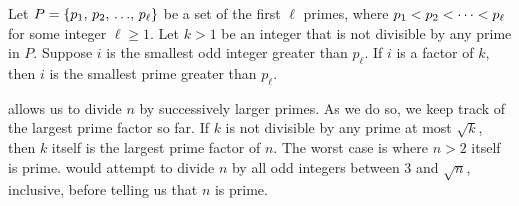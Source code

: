 \begin{theorem}
\label{thm:prime:next_smallest_prime}
Let $P = \left\{ {{p}_1},\, {{p}_2},\, {\dots},\, {{p}_{\ell}} \right\}$ be a set of the first $\ell$
primes, where ${p}_1 < {p}_2 < \cdots < {p}_{\ell}$ for some integer $\ell \geq 1$.  Let
$k > 1$ be an integer that is not divisible by any prime in $P$.
Suppose $i$ is the smallest odd integer greater than $p_{\ell}$.  If
$i$ is a factor of $k$, then $i$ is the smallest prime greater than
$p_{\ell}$.
\end{theorem}

 allows us to divide $n$ by
successively larger primes.  As we do so, we keep track of the largest
prime factor so far.  If $k$ is not divisible by any prime at most
$\sqrt{k}$, then $k$ itself is the largest prime factor of $n$.  The
worst case is where $n > 2$ itself is prime.
 would attempt to divide $n$ by
all odd integers between $3$ and $\sqrt{n}$, inclusive, before telling
us that $n$ is prime.